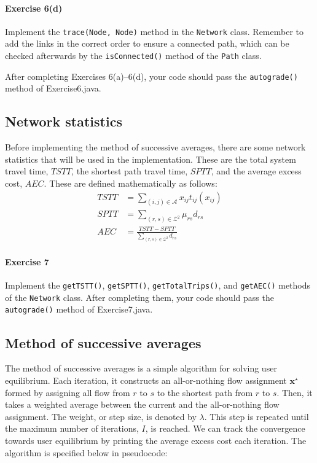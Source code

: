 \documentclass[12pt]{article}
\newcommand{\A}{\mathcal{A}}
\newcommand{\Z}{\mathcal{Z}}
\begin{document}

\paragraph*{Exercise 6(d)} Implement the \texttt{trace(Node, Node)} method in the \texttt{Network} class. 
Remember to add the links in the correct order to ensure a connected path, which can be checked afterwards by the \texttt{isConnected()} method of the \texttt{Path} class.

 \vspace{\baselineskip}


\noindent
After completing Exercises 6(a)--6(d), your code should pass the \texttt{autograde()} method of Exercise6.java. 


\subsection{Network statistics}

Before implementing the method of successive averages, there are some network statistics that will be used in the implementation. These are the total system travel time, $TSTT$, the shortest path travel time, $SPTT$, and the average excess cost, $AEC$. These are defined mathematically as follows:
\begin{align}
	TSTT &= \sum\limits_{(i,j)\in\A} x_{ij} t_{ij}(x_{ij})\\
	SPTT &= \sum\limits_{(r,s)\in\Z^2} \mu_{rs} d_{rs}\\
	AEC &= \frac{TSTT- SPTT}{\sum\limits_{(r,s)\in\Z^2} d_{rs}}
\end{align}

\paragraph*{Exercise 7} Implement the \texttt{getTSTT()}, \texttt{getSPTT()}, \texttt{getTotalTrips()}, and \texttt{getAEC()} methods of the \texttt{Network} class. After completing them, your code should pass the \texttt{autograde()} method of Exercise7.java. 



\subsection{Method of successive averages}


The method of successive averages is a simple algorithm for solving user equilibrium. Each iteration, it constructs an all-or-nothing flow assignment $\mathbf{x}^\star$ formed by assigning all flow from $r$ to $s$ to the shortest path from $r$ to $s$. Then, it takes a weighted average between the current and the all-or-nothing flow assignment. The weight, or step size, is denoted by $\lambda$. 
This step is repeated until the maximum number of iterations, $I$, is reached. We can track the convergence towards user equilibrium by printing the average excess cost each iteration.
The algorithm is specified below in pseudocode:
\end{document}
